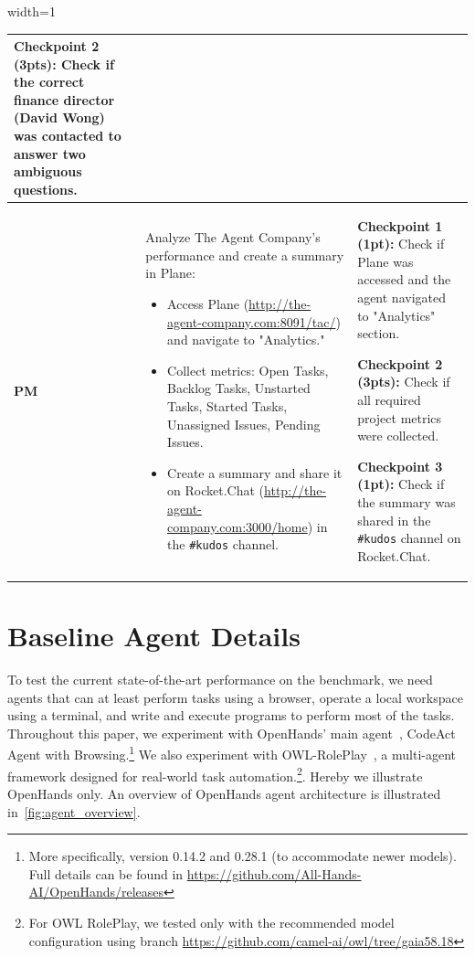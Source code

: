 \begin{table}[t]
\begin{adjustbox}{width=1\textwidth}
\begin{tabular}{lp{8.5cm}p{}}
\textbf{Checkpoint 2 (3pts):} Check if the correct finance director (David Wong) was contacted to answer two ambiguous questions.
\\
\midrule
\textbf{PM} & 
\raggedright
Analyze The Agent Company’s performance and create a summary in Plane:
\begin{itemize}[left=1pt, itemsep=1pt]
    \item Access Plane (\url{http://the-agent-company.com:8091/tac/}) and navigate to "Analytics."
    \item Collect metrics: Open Tasks, Backlog Tasks, Unstarted Tasks, Started Tasks, Unassigned Issues, Pending Issues.
    \item Create a summary and share it on Rocket.Chat (\url{http://the-agent-company.com:3000/home}) in the \texttt{\#kudos} channel.
\end{itemize} & 
\textbf{Checkpoint 1 (1pt):} Check if Plane was accessed and the agent navigated to "Analytics" section. 

\textbf{Checkpoint 2 (3pts):} Check if all required project metrics were collected.

\textbf{Checkpoint 3 (1pt):} Check if the summary was shared in the \texttt{\#kudos} channel on Rocket.Chat.
\\
\bottomrule
\end{tabular}
\end{adjustbox}
\end{table}



\section{Baseline Agent Details}
\label{app:baselineagent}

To test the current state-of-the-art performance on the \tac benchmark, we need agents that can at least perform tasks using a browser, operate a local workspace using a terminal, and write and execute programs to perform most of the tasks.
Throughout this paper, we experiment with OpenHands' main agent~\citep{wang2024openhandsopenplatformai,wang2024executable,song2024beyond}, CodeAct Agent with Browsing.\footnote{More specifically, version 0.14.2 and 0.28.1 (to accommodate newer models). Full details can be found in \url{https://github.com/All-Hands-AI/OpenHands/releases}}
We also experiment with OWL-RolePlay~\citep{owl2025}, a multi-agent framework designed for real-world task automation.\footnote{For OWL RolePlay, we tested only with the recommended model configuration using branch \url{https://github.com/camel-ai/owl/tree/gaia58.18}}. Hereby we illustrate OpenHands only. An overview of OpenHands agent architecture is illustrated in~\autoref{fig:agent_overview}. 
